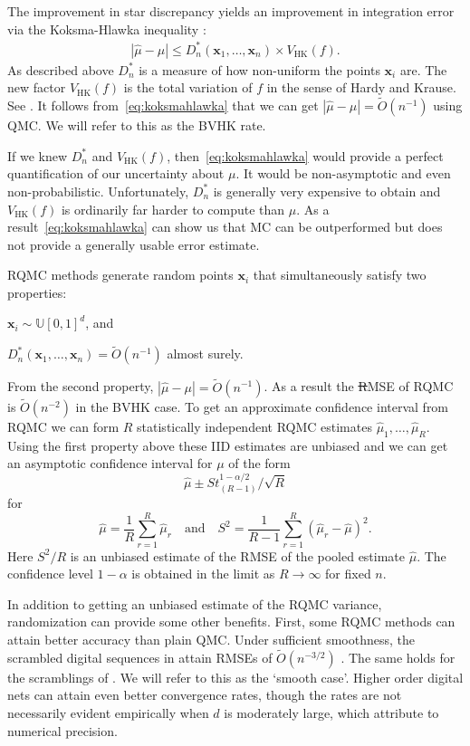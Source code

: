 \documentclass{article}
\newcommand{\fred}[1]{\begingroup\color{red}#1\endgroup}
\renewcommand{\le}{\leqslant}
\newcommand{\bsx}{\boldsymbol{x}}
\newcommand{\dunif}{\mathbb{U}}
\newcommand{\hk}{\mathrm{HK}}
\begin{document}
The improvement in star discrepancy yields an improvement
in integration error via the Koksma-Hlawka inequality \cite{Hic04a}:
\begin{align}\label{eq:koksmahlawka}
|\hat\mu-\mu|\le D_n^*(\bsx_1,\dots,\bsx_n)\times V_{\hk}(f).
\end{align}
As described above $D_n^*$ is a measure of how non-uniform
the points $\bsx_i$ are. The new factor $V_{\hk}(f)$ is the
total variation of $f$ in the sense of Hardy and Krause.
See \cite{Owe05a}. It follows from~\eqref{eq:koksmahlawka} 
that we can get $|\hat\mu-\mu|=\tilde O(n^{-1})$
using QMC. We will refer to this as the BVHK rate.

If we knew $D_n^*$ and $V_\hk(f)$, then~\eqref{eq:koksmahlawka} would provide a
perfect quantification of our uncertainty about $\mu$.
It would be non-asymptotic and even non-probabilistic.
Unfortunately, $D_n^*$ is generally very expensive
to obtain and $V_{\hk}(f)$ is ordinarily far harder
to compute than $\mu$. As a result~\eqref{eq:koksmahlawka}
can show us that MC can be outperformed but does
not provide a generally usable error estimate.

RQMC methods generate random points $\bsx_i$ that
simultaneously satisfy two properties:
\begin{compactenum}[\quad\bf1)]
\item $\bsx_i\sim\dunif[0,1]^d$, and
\item $D_n^*(\bsx_1,\dots,\bsx_n)=\tilde O(n^{-1})$ almost surely.
\end{compactenum}

From the second property, $|\hat\mu-\mu|=\tilde O(n^{-1})$.
As a result the \fred{\sout{R}}MSE of RQMC is $\tilde O(n^{-2})$
in the BVHK case.
To get an approximate confidence interval from RQMC
we can form $R$ statistically independent RQMC estimates
$\hat\mu_1,\dots,\hat\mu_R$. Using the first property
above these IID estimates are unbiased and we can get
an asymptotic confidence interval for $\mu$ of the form
$$
\hat\mu \pm S t_{(R-1)}^{1-\alpha/2}/\sqrt{R}
$$
for
$$
\hat\mu = \frac1R\sum_{r=1}^R\hat\mu_r
\quad\text{and}\quad
S^2 = \frac1{R-1}\sum_{r=1}^R(\hat\mu_r-\hat\mu)^2.
$$
Here $S^2/R$ is an unbiased estimate of the RMSE
of the pooled estimate $\hat\mu$.
The confidence level $1-\alpha$ is obtained in
the limit as $R\to\infty$ \cite{naka:tuff:2024}
for fixed $n$.

In addition to getting an unbiased estimate of
the RQMC variance, randomization can provide
some other benefits.  First, some RQMC methods
can attain better accuracy than plain QMC.
Under sufficient smoothness, the scrambled  digital sequences
in \cite{Owe95} attain RMSEs of $\tilde O(n^{-3/2})$
\cite{Owe97,Owe08a}. The same holds for the scramblings
of \cite{Mat98}. We will refer to this as the `smooth case'.
Higher order digital nets \cite{Dic11a} can attain even
better convergence rates, though the rates are not
necessarily evident empirically when $d$ is moderately
large, which \cite{nuyens2010higher} attribute to numerical precision.
\end{document}
